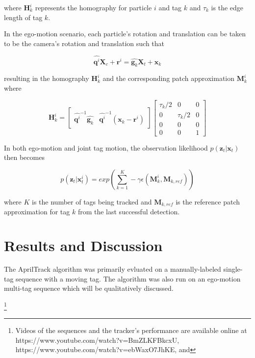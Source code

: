 \documentclass[letterpaper, 10 pt, conference]{ieeeconf}
\renewcommand{\vec}[1]{\boldsymbol{#1}}
\begin{document}
where $\vec{H}^i_k$ represents the homography for particle $i$ and tag $k$ and $\tau_k$ is the edge length of tag $k$.


In the ego-motion scenario, each particle's rotation and translation can be taken to be the camera's rotation and  translation such that

\begin{equation}
	\widehat{\vec{q}^i}\vec{X}_c + \vec{r}^i = \widehat{\vec{g}_k} \vec{X}_t + \vec{x}_k
\end{equation}

resulting in the homography $\vec{H}^i_k$ and the corresponding patch approximation $\vec{M}^i_k$ where

\begin{equation}
	\vec{H}^i_k = \begin{bmatrix}
		\widehat{\vec{q}^i}^{-1} \widehat{\vec{g}_k} & \widehat{\vec{q}^i}^{-1} (\vec{x}_k - \vec{r}^i)
	\end{bmatrix} \begin{bmatrix}
		\tau_k/2 & 0 & 0 \\
		0 & \tau_k/2 & 0 \\
		0 & 0 & 0 \\
		0 & 0 & 1
	\end{bmatrix}
\end{equation}


In both ego-motion and joint tag motion, the observation likelihood $p(\vec{z}_t|\vec{x}_{t})$ then becomes

\begin{equation}
	p(\vec{z}_t|\vec{x}^i_{t}) = exp(\sum^{K}_{k=1} -\gamma \epsilon(\vec{M}^i_k, \vec{M}_{k, ref}))
\end{equation}

where $K$ is the number of tags being tracked and $\vec{M}_{k,ref}$ is the reference patch approximation for tag $k$ from the last successful detection.

\section{Results and Discussion}

The AprilTrack algorithm was primarily evluated on a manually-labeled single-tag sequence with a moving tag. The algorithm was also run on an ego-motion multi-tag sequence which will be qualitatively discussed.

\footnote{Videos of the sequences and the tracker's performance are available online at https://www.youtube.com/watch?v=BmZLKFBkcxU, https://www.youtube.com/watch?v=ebWaxO7JhKE, and }
\end{document}
